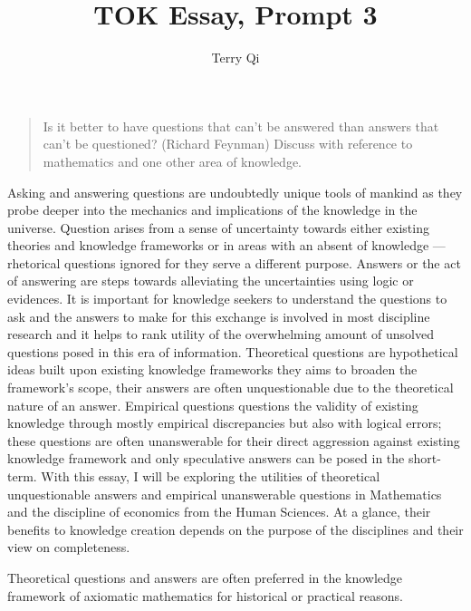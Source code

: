\documentclass[a4paper,12pt]{article}
\title{\vspace{-8ex}TOK Essay, Prompt 3}
\author{Terry Qi}
\date{}
\begin{document}
\maketitle
\begin{quote}
    Is it better to have questions that can't be answered than answers that can't be questioned? (Richard Feynman) Discuss with reference to mathematics and one other area of knowledge.
\end{quote}


Asking and answering questions are undoubtedly unique tools of mankind as they probe deeper into the mechanics and implications of the knowledge in the universe. Question arises from a sense of uncertainty towards either existing theories and knowledge frameworks or in areas with an absent of knowledge --- rhetorical questions ignored for they serve a different purpose. Answers or the act of answering are steps towards alleviating the uncertainties using logic or evidences. It is important for knowledge seekers to understand the questions to ask and the answers to make for this exchange is involved in most discipline research and it helps to rank utility of the overwhelming amount of unsolved questions posed in this era of information. Theoretical questions are hypothetical ideas built upon existing knowledge frameworks they aims to broaden the framework's scope, their answers are often unquestionable due to the theoretical nature of an answer. Empirical questions questions the validity of existing knowledge through mostly empirical discrepancies but also with logical errors; these questions are often unanswerable for their direct aggression against existing knowledge framework and only speculative answers can be posed in the short-term. With this essay, I will be exploring the utilities of theoretical unquestionable answers and empirical unanswerable questions in Mathematics and the discipline of economics from the Human Sciences. At a glance, their benefits to knowledge creation depends on the purpose of the disciplines and their view on completeness.


Theoretical questions and answers are often preferred in the knowledge framework of axiomatic mathematics for historical or practical reasons.




















\end{document}

